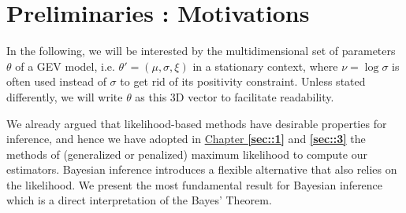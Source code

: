 \section{Preliminaries : Motivations}\label{sec:bayprelim}


In the following, we will be interested by the multidimensional set of parameters $\theta$ of a GEV model, i.e. $\theta'=(\mu,\sigma,\xi)$ in a stationary context, where $\nu=\log \sigma$ is often used instead of $\sigma$ to get rid of its positivity constraint.
 Unless stated differently, we will write $\theta$ as this $3$D vector to facilitate readability.
 
We already argued that likelihood-based methods have desirable properties for inference, and hence we have adopted in \hyperref[sec::1]{Chapter \textbf{\ref{sec::1}}} and \textbf{\ref{sec::3}} the methods of (generalized or penalized) maximum likelihood to compute our estimators. Bayesian inference introduces a flexible alternative that also relies on the likelihood. We present the most fundamental result for Bayesian inference which is a direct interpretation of the Bayes' Theorem.

